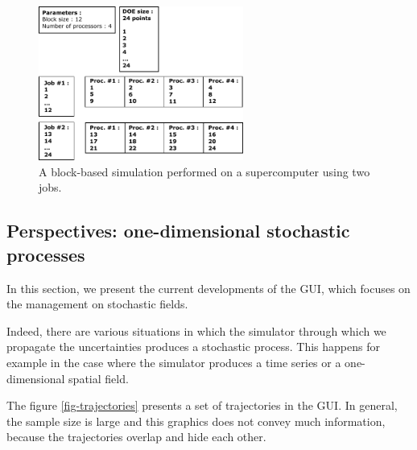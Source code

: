 \documentclass{article}
\begin{document}
\begin{figure}
\centering
\includegraphics[width=0.6\textwidth]{figures/SALOME-OpenTURNS-simulation-byblock.pdf}
\caption{A block-based simulation performed on a supercomputer using two jobs.}
\label{fig-blockalgo}
\end{figure}



\subsection{Perspectives: one-dimensional stochastic processes}

In this section, we present the current developments of the GUI, which focuses on the 
management on stochastic fields. 

Indeed, there are various situations in which the simulator through which we propagate the 
uncertainties produces a stochastic process. 
This happens for example in the case where the simulator produces a time series or 
a one-dimensional spatial field. 

The figure \ref{fig-trajectories} presents a set of trajectories in the GUI. 
In general, the sample size is large and this graphics does not convey much information, 
because the trajectories overlap and hide each other. 
\end{document}

